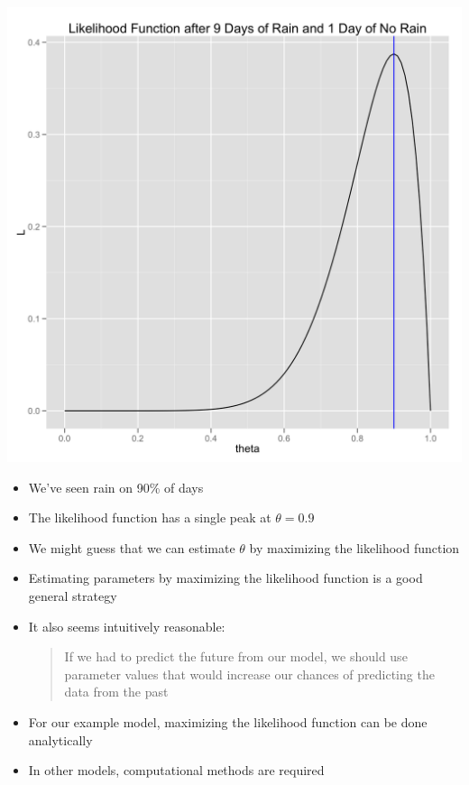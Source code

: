 \documentclass{beamer}
\begin{document}
\frame
{
  \begin{center}
    \includegraphics[scale = 0.1]{likelihood_function_mle.png}
  \end{center}
}

\frame
{
 \begin{itemize}
   \item{We've seen rain on 90\% of days}
   \item{The likelihood function has a single peak at $\theta = 0.9$}
   \item{We might guess that we can estimate $\theta$ by maximizing the likelihood function}
 \end{itemize}
}

\frame
{
  \begin{itemize}
    \item{Estimating parameters by maximizing the likelihood function is a good general strategy}
    \item{It also seems intuitively reasonable:}
    \begin{quote}
If we had to predict the future from our model, we should use parameter values that would increase our chances of predicting the data from the past
\end{quote}
  \end{itemize}
}

\frame
{
  \begin{itemize}
    \item{For our example model, maximizing the likelihood function can be done analytically}
    \item{In other models, computational methods are required}
  \end{itemize}
}
\end{document}
